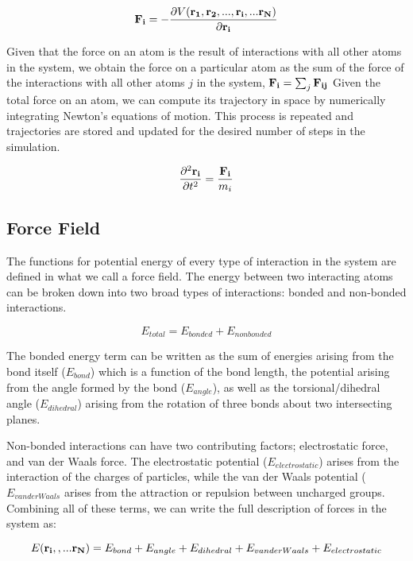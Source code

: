 \begin{equation}
\mathbf{F_i}  = -\frac{\partial V(\mathbf{r_1}, \mathbf{r_2}, ..., \mathbf{r_i}, ... \mathbf{r_N)}}{\partial \mathbf{r_i}} 
 \end{equation}

 Given that the force on an atom is the result of interactions with all other atoms in the system, we obtain the force on a particular atom as the sum of the force of the interactions with all other atoms $j$ in the system,  $\mathbf{F_i} = \sum_{j} \mathbf{F_{ij}}$ Given the total force on an atom, we can compute its trajectory in space by numerically integrating Newton's equations of motion. This process is repeated and trajectories are stored and updated for the desired number of steps in the simulation.
 
 \begin{equation}
 \frac{\partial^2 \mathbf{r_{i}}}{\partial t^2} = \frac{\mathbf{F_i}}{m_i}
\end{equation}

\subsection{Force Field}

The functions for potential energy of every type of interaction in the system are defined in what we call a force field. The energy between two interacting atoms can be broken down into two broad types of interactions: bonded and non-bonded interactions.

\begin{equation}
E_{total} = E_{bonded} + E_{non bonded}
\end{equation}

The bonded energy term can be written as the sum of energies arising from the bond itself  ($E_{bond}$) which is a function of the bond length, the potential arising from the angle formed by the bond ($E_{angle}$), as well as the torsional/dihedral angle ($E_{dihedral}$) arising from the rotation of three bonds about two intersecting planes.

Non-bonded interactions can have two contributing factors; electrostatic force, and van der Waals force. The electrostatic potential ($E_{electrostatic}$) arises from the interaction of the charges of particles, while the van der Waals potential  ($E_{van der Waals}$ arises from the attraction or repulsion between uncharged groups. Combining all of these terms, we can write the full description of forces in the system as:

\begin{equation}
E(\mathbf{r_i},, ... \mathbf{r_{N}}) = E_{bond} + E_{angle} + E_{dihedral} + E_{van der Waals} + E_{electrostatic} 
\end{equation}


